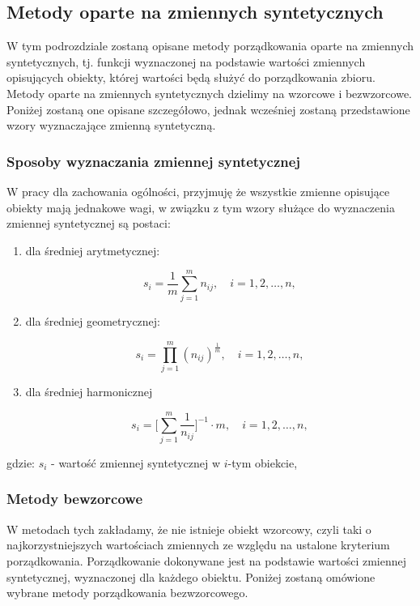 \documentclass[12pt,a4paper]{report}
\begin{document}



\subsection{Metody oparte na zmiennych syntetycznych}

W tym podrozdziale zostaną opisane metody porządkowania oparte na zmiennych syntetycznych, tj. funkcji wyznaczonej na podstawie wartości zmiennych opisujących obiekty, której wartości będą służyć do porządkowania zbioru. Metody oparte na zmiennych syntetycznych dzielimy na wzorcowe i bezwzorcowe. Poniżej zostaną one opisane szczegółowo, jednak wcześniej zostaną przedstawione wzory wyznaczające zmienną syntetyczną. 

\subsubsection{Sposoby wyznaczania zmiennej syntetycznej}
W pracy dla zachowania ogólności, przyjmuję że wszystkie zmienne opisujące obiekty mają jednakowe wagi, w związku z tym wzory służące do wyznaczenia zmiennej syntetycznej są postaci:
\begin{enumerate}
\item dla średniej arytmetycznej:

$$
s_{i}=\frac{1}{m} \sum_{j=1}^{m} n_{ij},  \quad i=1, 2, \ldots, n,
$$

\item dla średniej geometrycznej:

$$
s_{i}=\prod_{j=1}^{m} (n_{ij})^{\frac{1}{m}}, \quad i=1, 2, \ldots, n,
$$

\item dla średniej harmonicznej

$$
s_{i}=\big[\sum_{j=1}^{m} \frac{1}{n_{ij}}\big]^{-1} \cdot m, \quad i=1, 2, \ldots, n,
$$

\end{enumerate}
gdzie:
$s_{i}$ - wartość zmiennej syntetycznej w $i$-tym obiekcie,



\subsubsection{Metody bewzorcowe}


W metodach tych zakładamy, że nie istnieje obiekt wzorcowy, czyli taki o najkorzystniejszych wartościach zmiennych ze względu na ustalone kryterium porządkowania. Porządkowanie dokonywane jest na podstawie wartości zmiennej syntetycznej, wyznaczonej dla każdego obiektu. 
Poniżej zostaną omówione wybrane metody porządkowania bezwzorcowego.
\end{document}
